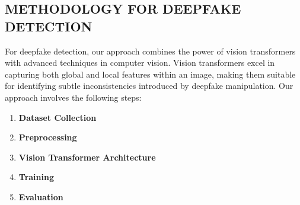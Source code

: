 \subsection{METHODOLOGY FOR DEEPFAKE DETECTION }

For deepfake detection, our approach combines the power of vision transformers with advanced techniques in computer vision. Vision transformers excel in capturing both global and local features within an image, making them suitable for identifying subtle inconsistencies introduced by deepfake manipulation.
\newpage
Our approach involves the following steps:
\vspace{0.2cm}
\begin{enumerate}
    \item \textbf{Dataset Collection}
    \item \textbf{Preprocessing}
    \item \textbf{Vision Transformer Architecture}
    \item \textbf{Training}
    \item \textbf{Evaluation}

\end{enumerate}





